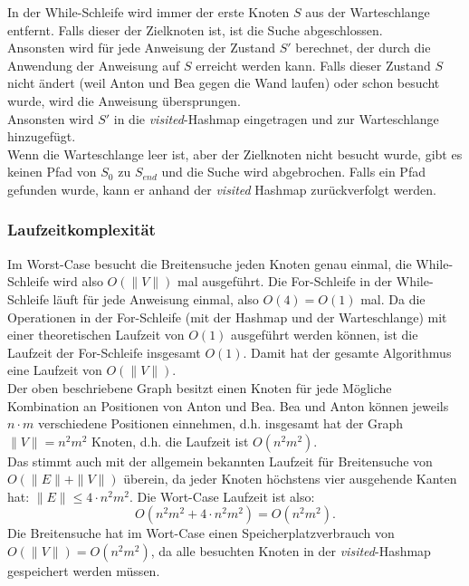 \documentclass[a4paper,10pt,ngerman]{scrartcl}
\begin{document}
    In der While-Schleife wird immer der erste Knoten $S$ aus der Warteschlange entfernt.
    Falls dieser der Zielknoten ist, ist die Suche abgeschlossen.\\
    Ansonsten wird für jede Anweisung der Zustand $S'$ berechnet, der durch die Anwendung der Anweisung auf $S$ erreicht werden kann.
    Falls dieser Zustand $S$ nicht ändert (weil Anton und Bea gegen die Wand laufen) oder schon besucht wurde, wird die Anweisung übersprungen.\\
    Ansonsten wird $S'$ in die \textit{visited}-Hashmap eingetragen und zur Warteschlange hinzugefügt.\\
    Wenn die Warteschlange leer ist, aber der Zielknoten nicht besucht wurde, gibt es keinen Pfad von $S_0$ zu $S_{end}$ und die Suche wird abgebrochen.
    Falls ein Pfad gefunden wurde, kann er anhand der \textit{visited} Hashmap zurückverfolgt werden.

    \subsubsection{Laufzeitkomplexität}
    Im Worst-Case besucht die Breitensuche jeden Knoten genau einmal, die While-Schleife wird also $O(\|V\|)$ mal ausgeführt.
    Die For-Schleife in der While-Schleife läuft für jede Anweisung einmal, also $O(4) = O(1)$ mal.
    Da die Operationen in der For-Schleife (mit der Hashmap und der Warteschlange) mit einer theoretischen Laufzeit von $O(1)$ ausgeführt werden können, ist die Laufzeit der For-Schleife insgesamt $O(1)$.
    Damit hat der gesamte Algorithmus eine Laufzeit von $O(\|V\|)$. \\
    Der oben beschriebene Graph besitzt einen Knoten für jede Mögliche Kombination an Positionen von Anton und Bea.
    Bea und Anton können jeweils $n \cdot m$ verschiedene Positionen einnehmen, d.h. insgesamt hat der Graph $\|V\| = n^2 m^2$ Knoten, d.h. die Laufzeit ist $O(n^2 m^2)$. \\
    Das stimmt auch mit der allgemein bekannten Laufzeit für Breitensuche von $O(\|E\| + \|V\|)$ überein, da jeder Knoten höchstens vier ausgehende Kanten hat: $\|E\| \le 4 \cdot n ^2 m^2$.
    Die Wort-Case Laufzeit ist also: \[O(n^2 m^2 + 4 \cdot n^2 m^2) = O(n^2 m^2).\]
    Die Breitensuche hat im Wort-Case einen Speicherplatzverbrauch von $O(\|V\|) =  O(n^2 m^2)$, da alle besuchten Knoten in der \textit{visited}-Hashmap gespeichert werden müssen.
\end{document}
